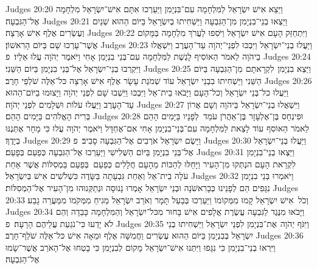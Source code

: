 Judges 20:20	וַיֵּצֵא אִישׁ יִשְׂרָאֵל לַמִּלְחָמָה עִם־בִּנְיָמִן וַיַּעַרְכוּ אִתָּם אִישׁ־יִשְׂרָאֵל מִלְחָמָה אֶל־הַגִּבְעָה׃
Judges 20:21	וַיֵּצְאוּ בְנֵי־בִנְיָמִן מִן־הַגִּבְעָה וַיַּשְׁחִיתוּ בְיִשְׂרָאֵל בַּיּוֹם הַהוּא שְׁנַיִם וְעֶשְׂרִים אֶלֶף אִישׁ אָרְצָה׃
Judges 20:22	וַיִּתְחַזֵּק הָעָם אִישׁ יִשְׂרָאֵל וַיֹּסִפוּ לַעֲרֹךְ מִלְחָמָה בַּמָּקוֹם אֲשֶׁר־עָרְכוּ שָׁם בַּיּוֹם הָרִאשׁוֹן׃
Judges 20:23	וַיַּעֲלוּ בְנֵי־יִשְׂרָאֵל וַיִּבְכּוּ לִפְנֵי־יְהֹוָה עַד־הָעֶרֶב וַיִּשְׁאֲלוּ בַיהֹוָה לֵאמֹר הַאוֹסִיף לָגֶשֶׁת לַמִּלְחָמָה עִם־בְּנֵי בִנְיָמִן אָחִי וַיֹּאמֶר יְהֹוָה עֲלוּ אֵלָיו׃ {פ}
Judges 20:24	וַיִּקְרְבוּ בְנֵי־יִשְׂרָאֵל אֶל־בְּנֵי בִנְיָמִן בַּיּוֹם הַשֵּׁנִי׃
Judges 20:25	וַיֵּצֵא בִנְיָמִן  לִקְרָאתָם  מִן־הַגִּבְעָה בַּיּוֹם הַשֵּׁנִי וַיַּשְׁחִיתוּ בִבְנֵי יִשְׂרָאֵל עוֹד שְׁמֹנַת עָשָׂר אֶלֶף אִישׁ אָרְצָה כּל־אֵלֶּה שֹׁלְפֵי חָרֶב׃
Judges 20:26	וַיַּעֲלוּ כל־בְּנֵי יִשְׂרָאֵל וְכל־הָעָם וַיָּבֹאוּ בֵית־אֵל וַיִּבְכּוּ וַיֵּשְׁבוּ שָׁם לִפְנֵי יְהֹוָה וַיָּצוּמוּ בַיּוֹם־הַהוּא עַד־הָעָרֶב וַיַּעֲלוּ עֹלוֹת וּשְׁלָמִים לִפְנֵי יְהֹוָה׃
Judges 20:27	וַיִּשְׁאֲלוּ בְנֵי־יִשְׂרָאֵל בַּיהֹוָה וְשָׁם אֲרוֹן בְּרִית הָאֱלֹהִים בַּיָּמִים הָהֵם׃
Judges 20:28	וּפִינְחָס בֶּן־אֶלְעָזָר בֶּן־אַהֲרֹן עֹמֵד  לְפָנָיו בַּיָּמִים הָהֵם לֵאמֹר הַאוֹסִף עוֹד לָצֵאת לַמִּלְחָמָה עִם־בְּנֵי־בִנְיָמִן אָחִי אִם־אֶחְדָּל וַיֹּאמֶר יְהֹוָה עֲלוּ כִּי מָחָר אֶתְּנֶנּוּ בְיָדֶךָ׃
Judges 20:29	וַיָּשֶׂם יִשְׂרָאֵל אֹרְבִים אֶל־הַגִּבְעָה סָבִיב׃ {פ}
Judges 20:30	וַיַּעֲלוּ בְנֵי־יִשְׂרָאֵל אֶל־בְּנֵי בִנְיָמִן בַּיּוֹם הַשְּׁלִישִׁי וַיַּעַרְכוּ אֶל־הַגִּבְעָה כְּפַעַם בְּפָעַם׃
Judges 20:31	וַיֵּצְאוּ בְנֵי־בִנְיָמִן לִקְרַאת הָעָם הנְתְּקוּ מִן־הָעִיר וַיָּחֵלּוּ לְהַכּוֹת מֵהָעָם חֲלָלִים כְּפַעַם  בְּפַעַם בַּמְסִלּוֹת אֲשֶׁר אַחַת עֹלָה בֵית־אֵל וְאַחַת גִּבְעָתָה בַּשָּׂדֶה כִּשְׁלֹשִׁים אִישׁ בְּיִשְׂרָאֵל׃
Judges 20:32	וַיֹּאמְרוּ בְּנֵי בִנְיָמִן נִגָּפִים הֵם לְפָנֵינוּ כְּבָרִאשֹׁנָה וּבְנֵי יִשְׂרָאֵל אָמְרוּ נָנוּסָה וּנְתַקְּנוּהוּ מִן־הָעִיר אֶל־הַמְסִלּוֹת׃
Judges 20:33	וְכֹל  אִישׁ יִשְׂרָאֵל קָמוּ מִמְּקוֹמוֹ וַיַּעַרְכוּ בְּבַעַל תָּמָר וְאֹרֵב יִשְׂרָאֵל מֵגִיחַ מִמְּקֹמוֹ מִמַּעֲרֵה גָבַע׃
Judges 20:34	וַיָּבֹאוּ מִנֶּגֶד לַגִּבְעָה עֲשֶׂרֶת אֲלָפִים אִישׁ בָּחוּר מִכּל־יִשְׂרָאֵל וְהַמִּלְחָמָה כָּבֵדָה וְהֵם לֹא יָדְעוּ כִּי־נֹגַעַת עֲלֵיהֶם הָרָעָה׃ {פ}
Judges 20:35	וַיִּגֹּף יְהֹוָה  אֶת־בִּנְיָמִן לִפְנֵי יִשְׂרָאֵל וַיַּשְׁחִיתוּ בְנֵי יִשְׂרָאֵל בְּבִנְיָמִן בַּיּוֹם הַהוּא עֶשְׂרִים וַחֲמִשָּׁה אֶלֶף וּמֵאָה אִישׁ כּל־אֵלֶּה שֹׁלֵף־חָרֶב׃
Judges 20:36	וַיִּרְאוּ בְנֵי־בִנְיָמִן כִּי נִגָּפוּ וַיִּתְּנוּ אִישׁ־יִשְׂרָאֵל מָקוֹם לְבִנְיָמִן כִּי בָטְחוּ אֶל־הָאֹרֵב אֲשֶׁר־שָׂמוּ אֶל־הַגִּבְעָה׃
